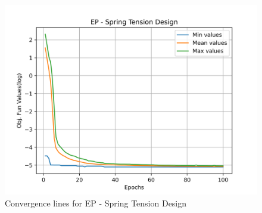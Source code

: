 \begin{figure}[H]
        \centering
        \caption{Convergence lines for EP - Spring Tension Design}
        \label{fig:spring_problem_solve_ep}
        \includegraphics[scale=0.5]{images/spring_problem_solve_ep.png}
        \end{figure}
        